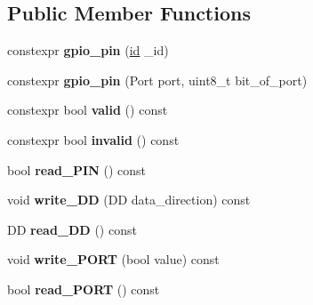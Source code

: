 \subsection*{Public Member Functions}
\begin{DoxyCompactItemize}
\item 
\mbox{\label{classfsl_1_1hw_1_1gpio__pin_ad54e5f33d0232ca59b512be84f6a28f8}} 
constexpr {\bfseries gpio\+\_\+pin} (\mbox{\hyperlink{classfsl_1_1lg_1_1range__int}{id}} \+\_\+id)
\item 
\mbox{\label{classfsl_1_1hw_1_1gpio__pin_ac42269fb8a346f3eda29f68c4f67336c}} 
constexpr {\bfseries gpio\+\_\+pin} (Port port, uint8\+\_\+t bit\+\_\+of\+\_\+port)
\item 
\mbox{\label{classfsl_1_1hw_1_1gpio__pin_a5e1578fe33adaae392451bf20be4e8e7}} 
constexpr bool {\bfseries valid} () const
\item 
\mbox{\label{classfsl_1_1hw_1_1gpio__pin_a40b84de46c8814cdb027f36e771a1f83}} 
constexpr bool {\bfseries invalid} () const
\item 
\mbox{\label{classfsl_1_1hw_1_1gpio__pin_aab3da1d4afef5fb6550b5a4fbbb323ed}} 
bool {\bfseries read\+\_\+\+P\+IN} () const
\item 
\mbox{\label{classfsl_1_1hw_1_1gpio__pin_a8b35945fe76ca311941b94df6c3c3817}} 
void {\bfseries write\+\_\+\+DD} (DD data\+\_\+direction) const
\item 
\mbox{\label{classfsl_1_1hw_1_1gpio__pin_a94b0d89a638c07fe23fb4dd1a5f86e41}} 
DD {\bfseries read\+\_\+\+DD} () const
\item 
\mbox{\label{classfsl_1_1hw_1_1gpio__pin_aa6ecdb43a6e9320cf3903e0148a43a0b}} 
void {\bfseries write\+\_\+\+P\+O\+RT} (bool value) const
\item 
\mbox{\label{classfsl_1_1hw_1_1gpio__pin_ab7904dca570aa1cceeb3ac3adc3ade0d}} 
bool {\bfseries read\+\_\+\+P\+O\+RT} () const
\item 

\end{DoxyCompactItemize}
